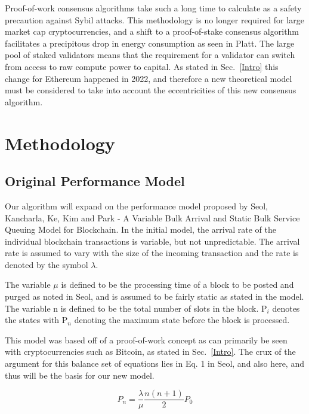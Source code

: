 \documentclass[conference]{IEEEtran}
\begin{document}
Proof-of-work consensus algorithms take such a long time to calculate as a safety precaution against
Sybil attacks. This methodology is no longer required for large market cap cryptocurrencies, and a 
shift to a proof-of-stake consensus algorithm facilitates a precipitous drop in energy consumption
as seen in Platt\cite{2021_IEEEQRSC_Platt}. The large pool of staked validators means that the 
requirement for a validator can switch from access to raw compute power to capital. As stated in 
Sec.~\ref{Intro} this change for Ethereum happened in 2022, and therefore a new theoretical model
must be considered to take into account the eccentricities of this new consensus algorithm. 

\section{Methodology}

\subsection{Original Performance Model}\label{Model}
Our algorithm will expand on the performance model proposed by Seol, Kancharla, Ke, Kim and Park
 - A Variable Bulk Arrival and Static Bulk Service Queuing Model for Blockchain\cite{2020_ACM_Seol}. 
 In the initial model, the arrival rate of the individual blockchain transactions is variable, but not unpredictable. 
 The arrival rate is assumed to vary with the size of the incoming transaction and the rate is 
 denoted by the symbol $\lambda$.

The variable $\mu$ is defined to be the processing time of a block to be posted and purged as noted 
in Seol\cite{2020_ACM_Seol}, and is assumed to be fairly static as stated in the model. 
The variable n is defined to be the total number of slots in the block. P$_i$ denotes the states with 
P$_n$ denoting the maximum state before the block is processed. 

This model was based off of a proof-of-work concept as can primarily be seen with cryptocurrencies 
such as Bitcoin, as stated in Sec.~\ref{Intro}. The crux of the argument for this balance set of equations 
lies in Eq. 1 in Seol\cite{2020_ACM_Seol}, and also here, and thus will be the basis for our 
new model. 

\begin{equation}
P_n = \frac{\lambda}{\mu}\frac{n(n+1)}{2}P_0\label{om_1}
\end{equation}
\end{document}
